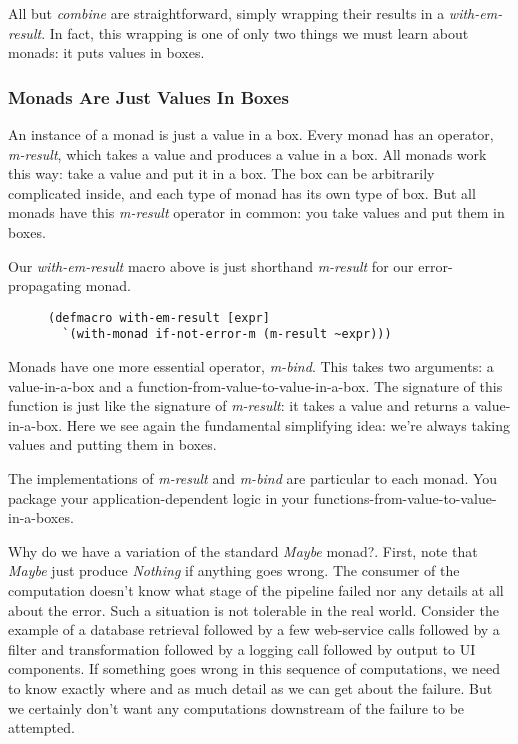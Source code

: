 \documentclass[11pt]{article}
\begin{document}
All but \emph{combine} are straightforward, simply wrapping their
results in a \emph{with-em-result}. In fact, this wrapping is one of
only two things we must learn about monads: it puts values in
boxes. 

\subsubsection{Monads Are Just Values In Boxes}
\label{sec-3-2-1}

An instance of a monad is just a value in a box. Every monad has an
operator, \emph{m-result}, which takes a value and produces a value in a
box. All monads work this way: take a value and put it in a box.
The box can be arbitrarily complicated inside, and each type of
monad has its own type of box. But all monads have this \emph{m-result}
operator in common: you take values and put them in boxes. 

Our \emph{with-em-result} macro above is just shorthand \emph{m-result} for
our error-propagating monad.

\begin{figure}[H]
\label{with-em-result-macro}
\begin{verbatim}
(defmacro with-em-result [expr]
  `(with-monad if-not-error-m (m-result ~expr)))
\end{verbatim}
\end{figure}

Monads have one more essential operator, \emph{m-bind}. This takes two
arguments: a value-in-a-box and a
function-from-value-to-value-in-a-box. The signature of this
function is just like the signature of \emph{m-result}: it takes a value
and returns a value-in-a-box. Here we see again the fundamental
simplifying idea: we're always taking values and putting them in
boxes.

The implementations of \emph{m-result} and \emph{m-bind} are particular to
each monad. You package your application-dependent logic in your
functions-from-value-to-value-in-a-boxes.

Why do we have a variation of the standard \emph{Maybe} monad?. First,
note that \emph{Maybe} just produce \emph{Nothing} if anything goes wrong.
The consumer of the computation doesn't know what stage of the
pipeline failed nor any details at all about the error. Such a
situation is not tolerable in the real world. Consider the example
of a database retrieval followed by a few web-service calls
followed by a filter and transformation followed by a logging call
followed by output to UI components. If something goes wrong in
this sequence of computations, we need to know exactly where and as
much detail as we can get about the failure. But we certainly don't
want any computations downstream of the failure to be attempted.
\end{document}
